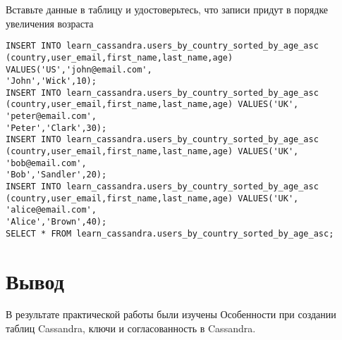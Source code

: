 Вставьте данные в таблицу и удостоверьтесь, что записи придут в порядке
увеличения возраста

\begin{verbatim}
INSERT INTO learn_cassandra.users_by_country_sorted_by_age_asc
(country,user_email,first_name,last_name,age) VALUES('US','john@email.com',
'John','Wick',10);
INSERT INTO learn_cassandra.users_by_country_sorted_by_age_asc
(country,user_email,first_name,last_name,age) VALUES('UK', 'peter@email.com',
'Peter','Clark',30);
INSERT INTO learn_cassandra.users_by_country_sorted_by_age_asc
(country,user_email,first_name,last_name,age) VALUES('UK', 'bob@email.com',
'Bob','Sandler',20);
INSERT INTO learn_cassandra.users_by_country_sorted_by_age_asc
(country,user_email,first_name,last_name,age) VALUES('UK', 'alice@email.com',
'Alice','Brown',40);
SELECT * FROM learn_cassandra.users_by_country_sorted_by_age_asc;
\end{verbatim}



\section*{\LARGE Вывод}
В результате практической работы были изучены Особенности при создании таблиц Cassandra, ключи и согласованность
в Cassandra.